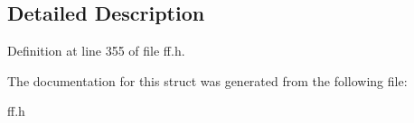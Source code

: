 \subsection{Detailed Description}


Definition at line 355 of file ff.\-h.



The documentation for this struct was generated from the following file\-:\begin{DoxyCompactItemize}
\item 
ff.\-h\end{DoxyCompactItemize}
